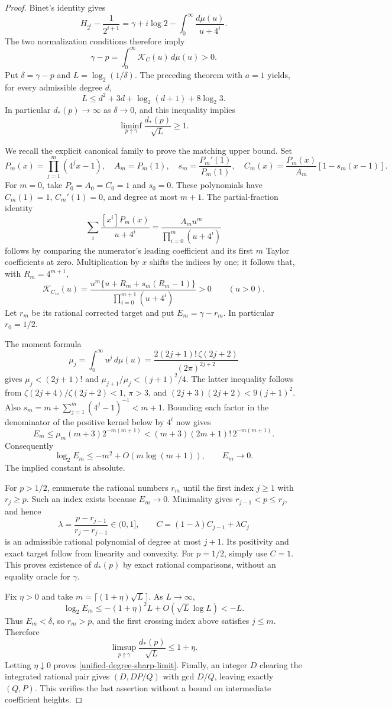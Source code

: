 \documentclass[11pt,a4paper]{article}
\theoremstyle{definition}
\theoremstyle{remark}
\begin{document}
\begin{proof}
Binet's identity gives
\[
 H_{2^i}-\frac1{2^{i+1}}
 =\gamma+i\log2-\int_0^\infty\frac{d\mu(u)}{u+4^i}.
\]
The two normalization conditions therefore imply
\[
 \gamma-p=\int_0^\infty\mathcal K_C(u)\,d\mu(u)>0.
\]
Put $\delta=\gamma-p$ and $L=\log_2(1/\delta)$.  The preceding
theorem with $a=1$ yields, for every admissible degree $d$,
\[
 L\le d^2+3d+\log_2(d+1)+8\log_2 3.
\]
In particular $d_*(p)\to\infty$ as $\delta\to0$, and this inequality
implies
\[
 \liminf_{p\uparrow\gamma}\frac{d_*(p)}{\sqrt L}\ge1.
\]

We recall the explicit canonical family to prove the matching upper bound.
Set
\[
 P_m(x)=\prod_{j=1}^m(4^jx-1),\quad
 A_m=P_m(1),\quad s_m=\frac{P_m'(1)}{P_m(1)},\quad
 C_m(x)=\frac{P_m(x)}{A_m}[1-s_m(x-1)].
\]
For $m=0$, take $P_0=A_0=C_0=1$ and $s_0=0$.  These polynomials
have $C_m(1)=1$, $C_m'(1)=0$, and degree at most $m+1$.
The partial-fraction identity
\[
 \sum_i\frac{[x^i]P_m(x)}{u+4^i}
   =\frac{A_m u^m}{\prod_{i=0}^m(u+4^i)}
\]
follows by comparing the numerator's leading coefficient and its first
$m$ Taylor coefficients at zero.  Multiplication by $x$ shifts the
indices by one; it follows that, with $R_m=4^{m+1}$,
\[
 \mathcal K_{C_m}(u)=
 \frac{u^m\{u+R_m+s_m(R_m-1)\}}
      {\prod_{i=0}^{m+1}(u+4^i)}>0\qquad(u>0).
\]
Let $r_m$ be its rational corrected target and put
$E_m=\gamma-r_m$.  In particular $r_0=1/2$.

The moment formula
\[
 \mu_j=\int_0^\infty u^j\,d\mu(u)
 =\frac{2(2j+1)!\,\zeta(2j+2)}{(2\pi)^{2j+2}}
\]
gives $\mu_j<(2j+1)!$ and
$\mu_{j+1}/\mu_j<(j+1)^2/4$.  The latter inequality follows from
$\zeta(2j+4)/\zeta(2j+2)<1$, $\pi>3$, and
$(2j+3)(2j+2)<9(j+1)^2$.
Also $s_m=m+\sum_{j=1}^m(4^j-1)^{-1}<m+1$.
Bounding each factor in the denominator of the positive kernel below
by $4^i$ now gives
\[
 E_m\le\mu_m(m+3)2^{-m(m+1)}
 <(m+3)(2m+1)!\,2^{-m(m+1)}.
\]
Consequently
\[
 \log_2 E_m\le -m^2+O(m\log(m+1)),\qquad E_m\longrightarrow0.
\]
The implied constant is absolute.

For $p>1/2$, enumerate the rational numbers $r_m$ until the first
index $j\ge1$ with $r_j\ge p$.  Such an index exists because
$E_m\to0$.  Minimality gives $r_{j-1}<p\le r_j$, and hence
\[
 \lambda=\frac{p-r_{j-1}}{r_j-r_{j-1}}\in(0,1],\qquad
 C=(1-\lambda)C_{j-1}+\lambda C_j
\]
is an admissible rational polynomial of degree at most $j+1$.
Its positivity and exact target follow from linearity and convexity.
For $p=1/2$, simply use $C=1$.  This proves existence of $d_*(p)$
by exact rational comparisons, without an equality oracle for $\gamma$.

Fix $\eta>0$ and take $m=\lceil(1+\eta)\sqrt L\rceil$.
As $L\to\infty$,
\[
 \log_2 E_m\le -(1+\eta)^2L+O(\sqrt L\log L)<-L.
\]
Thus $E_m<\delta$, so $r_m>p$, and the first crossing index above
satisfies $j\le m$.  Therefore
\[
 \limsup_{p\uparrow\gamma}\frac{d_*(p)}{\sqrt L}\le1+\eta.
\]
Letting $\eta\downarrow0$ proves \eqref{unified-degree-sharp-limit}.
Finally, an integer $D$ clearing the integrated rational pair gives
$(D,DP/Q)$ with gcd $D/Q$, leaving exactly $(Q,P)$.  This verifies
the last assertion without a bound on intermediate coefficient heights.
\end{proof}
\end{document}
